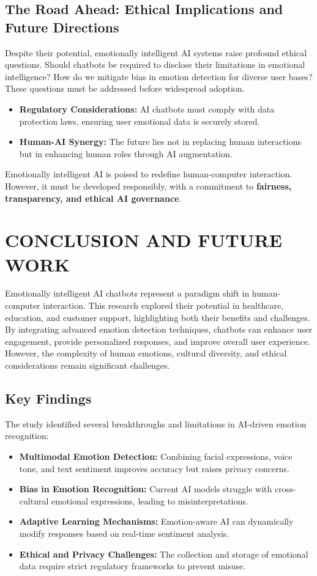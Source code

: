 \documentclass[a4paper,10pt]{article}
\begin{document}
\subsection{The Road Ahead: Ethical Implications and Future Directions}
Despite their potential, emotionally intelligent AI systems raise profound ethical questions. Should chatbots be required to disclose their limitations in emotional intelligence? How do we mitigate bias in emotion detection for diverse user bases? These questions must be addressed before widespread adoption.

\begin{itemize}
    \item \textbf{Regulatory Considerations:} AI chatbots must comply with data protection laws, ensuring user emotional data is securely stored.
    \item \textbf{Human-AI Synergy:} The future lies not in replacing human interactions but in enhancing human roles through AI augmentation.
\end{itemize}



Emotionally intelligent AI is poised to redefine human-computer interaction. However, it must be developed responsibly, with a commitment to \textbf{fairness, transparency, and ethical AI governance}.

\section{CONCLUSION AND FUTURE WORK}

Emotionally intelligent AI chatbots represent a paradigm shift in human-computer interaction. This research explored their potential in healthcare, education, and customer support, highlighting both their benefits and challenges. By integrating advanced emotion detection techniques, chatbots can enhance user engagement, provide personalized responses, and improve overall user experience. However, the complexity of human emotions, cultural diversity, and ethical considerations remain significant challenges.

\subsection{Key Findings}
The study identified several breakthroughs and limitations in AI-driven emotion recognition:
\begin{itemize}
    \item \textbf{Multimodal Emotion Detection:} Combining facial expressions, voice tone, and text sentiment improves accuracy but raises privacy concerns.
    \item \textbf{Bias in Emotion Recognition:} Current AI models struggle with cross-cultural emotional expressions, leading to misinterpretations.
    \item \textbf{Adaptive Learning Mechanisms:} Emotion-aware AI can dynamically modify responses based on real-time sentiment analysis.
    \item \textbf{Ethical and Privacy Challenges:} The collection and storage of emotional data require strict regulatory frameworks to prevent misuse.
\end{itemize}
\end{document}
